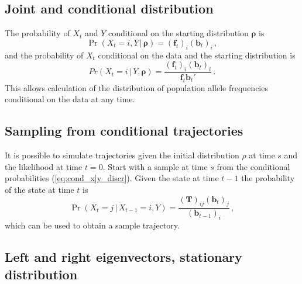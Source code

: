 \documentclass[preprint]{elsarticle}
\newcommand{\bs}[1]{\ensuremath{\boldsymbol{#1}}}
\newcommand\given{{\,|\,}}
\newcommand\x[1]{\ensuremath{X_{#1}}}
\newcommand\y{\ensuremath{Y}}
\newcommand\s{\ensuremath{s}}
\newcommand\fv[1]{\ensuremath{\mathbf{f}_{#1}}}
\newcommand\bv[1]{\ensuremath{\mathbf{b}_{#1}}}
\begin{document}
\subsection{Joint and conditional distribution}

The probability of $\x{t}$ and $\y$ conditional on the starting distribution $\bs{\rho}$ is
\begin{equation}\label{eq:joint_xy_discr}
\Pr(\x{t}=i,\y \given \bs{\rho}) = (\fv{t})_i (\bv{t})_i\,,
\end{equation}
and the probability of $\x{t}$ conditional on the data and the starting distribution is
\begin{equation}\label{eq:cond_x|y_discr}
Pr(\x{t}=i \given \y,\bs{\rho}) = \frac{(\fv{t})_i (\bv{t})_i}{\fv{t}\bv{t}'}\,.
\end{equation}
This allows calculation of the distribution of population allele frequencies conditional on the data at any time.

\subsection{Sampling from conditional trajectories}

It is possible to simulate trajectories given the initial distribution $\rho$ at time $\s$ and the likelihood at time $t=0$. Start with a sample at time $\s$ from the conditional probabilities (\ref{eq:cond_x|y_discr}). Given the state at time $t-1$ the probability of the state at time $t$ is
\begin{equation}
    \Pr(\x{t}=j\given \x{t-1}=i,\y)=\frac{(\mathbf{T})_{ij}(\mathbf{b}_{t})_j}{(\mathbf{b}_{t-1})_i}\,,
\end{equation}
which can be used to obtain a sample trajectory. 

\subsection{Left and right eigenvectors, stationary distribution}
\end{document}
